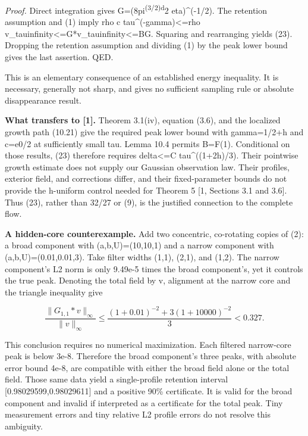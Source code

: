 \documentclass[
]{article}
\begin{document}
\emph{Proof.} Direct integration gives
\textbar\textbar G\textbar{}=(8pi\textsuperscript{(3/2)d}2
eta)\^{}(-1/2). The retention assumption and (1) imply rho c
tau\^{}(-gamma)\textless=rho
\textbar\textbar v\_tau\textbar\textbar infinity\textless=\textbar\textbar G*v\_tau\textbar\textbar infinity\textless=B\textbar\textbar G\textbar{}.
Squaring and rearranging yields (23). Dropping the retention assumption
and dividing (1) by the peak lower bound gives the last assertion. QED.

This is an elementary consequence of an established energy inequality.
It is necessary, generally not sharp, and gives no sufficient sampling
rule or absolute disappearance result.

\textbf{What transfers to {[}1{]}.} Theorem 3.1(iv), equation (3.6), and
the localized growth path (10.21) give the required peak lower bound
with gamma=1/2+h and c=e0/2 at sufficiently small tau. Lemma 10.4
permits B=F(1). Conditional on those results, (23) therefore requires
delta\textless=C tau\^{}((1+2h)/3). Their pointwise growth estimate does
not supply our Gaussian observation law. Their profiles, exterior field,
and corrections differ, and their fixed-parameter bounds do not provide
the h-uniform control needed for Theorem 5 {[}1, Sections 3.1 and
3.6{]}. Thus (23), rather than 32/27 or (9), is the justified connection
to the complete flow.

\textbf{A hidden-core counterexample.} Add two concentric, co-rotating
copies of (2): a broad component with (a,b,U)=(10,10,1) and a narrow
component with (a,b,U)=(0.01,0.01,3). Take filter widths (1,1), (2,1),
and (1,2). The narrow component's L2 norm is only 9.49e-5 times the
broad component's, yet it controls the true peak. Denoting the total
field by v, alignment at the narrow core and the triangle inequality
give

\[
\frac{\|G_{1,1}*v\|_\infty}{\|v\|_\infty}
\leq\frac{(1+0.01)^{-2}+3(1+10000)^{-2}}{3}
<0.327. \tag{24}
\]

This conclusion requires no numerical maximization. Each filtered
narrow-core peak is below 3e-8. Therefore the broad component's three
peaks, with absolute error bound 4e-8, are compatible with either the
broad field alone or the total field. Those same data yield a
single-profile retention interval {[}0.98029599,0.98029611{]} and a
positive 90\% certificate. It is valid for the broad component and
invalid if interpreted as a certificate for the total peak. Tiny
measurement errors and tiny relative L2 profile errors do not resolve
this ambiguity.
\end{document}
